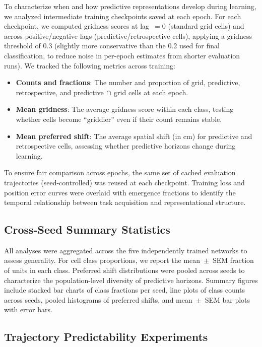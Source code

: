\documentclass[11pt]{article}
\begin{document}
To characterize when and how predictive representations develop during learning, we analyzed intermediate training checkpoints saved at each epoch. For each checkpoint, we computed gridness scores at lag~$= 0$ (standard grid cells) and across positive/negative lags (predictive/retrospective cells), applying a gridness threshold of 0.3 (slightly more conservative than the 0.2 used for final classification, to reduce noise in per-epoch estimates from shorter evaluation runs). We tracked the following metrics across training:
\begin{itemize}
    \item \textbf{Counts and fractions}: The number and proportion of grid, predictive, retrospective, and predictive$\,\cap\,$grid cells at each epoch.
    \item \textbf{Mean gridness}: The average gridness score within each class, testing whether cells become ``griddier'' even if their count remains stable.
    \item \textbf{Mean preferred shift}: The average spatial shift (in cm) for predictive and retrospective cells, assessing whether predictive horizons change during learning.
\end{itemize}

To ensure fair comparison across epochs, the same set of cached evaluation trajectories (seed-controlled) was reused at each checkpoint. Training loss and position error curves were overlaid with emergence fractions to identify the temporal relationship between task acquisition and representational structure.


\subsection*{Cross-Seed Summary Statistics}

All analyses were aggregated across the five independently trained networks to assess generality. For cell class proportions, we report the mean~$\pm$~SEM fraction of units in each class. Preferred shift distributions were pooled across seeds to characterize the population-level diversity of predictive horizons. Summary figures include stacked bar charts of class fractions per seed, line plots of class counts across seeds, pooled histograms of preferred shifts, and mean~$\pm$~SEM bar plots with error bars.


\subsection*{Trajectory Predictability Experiments}
\end{document}
